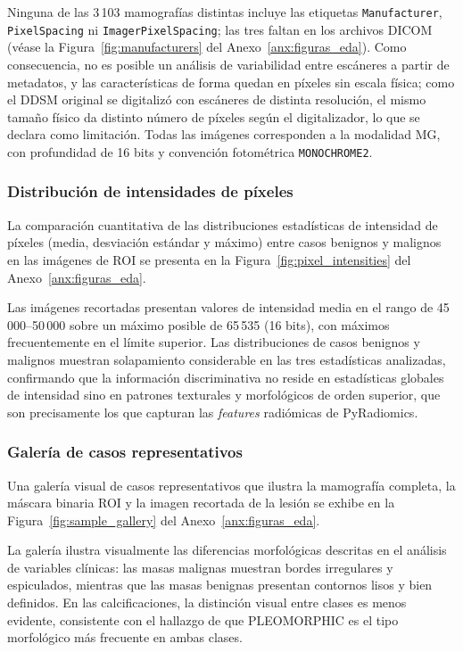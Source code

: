 Ninguna de las 3\,103 mamografías distintas incluye las etiquetas
\texttt{Manufacturer}, \texttt{PixelSpacing} ni
\texttt{ImagerPixelSpacing}; las tres faltan en los archivos
DICOM (véase la Figura~\ref{fig:manufacturers} del Anexo~\ref{anx:figuras_eda}).
Como consecuencia, no es posible un análisis de
variabilidad entre escáneres a partir de metadatos, y las
características de forma quedan en píxeles sin escala física;
como el DDSM original se digitalizó con escáneres de distinta
resolución, el mismo tamaño físico da distinto número de
píxeles según el digitalizador, lo que se declara como
limitación. Todas las imágenes corresponden a la modalidad MG,
con profundidad de 16 bits y convención fotométrica
\texttt{MONOCHROME2}.

\subsubsection{Distribución de intensidades de píxeles}

La comparación cuantitativa de las distribuciones estadísticas
de intensidad de píxeles (media, desviación estándar y máximo)
entre casos benignos y malignos en las imágenes de ROI se presenta
en la Figura~\ref{fig:pixel_intensities} del Anexo~\ref{anx:figuras_eda}.

Las imágenes recortadas presentan valores de
intensidad media en el rango de 45\,000--50\,000
sobre un máximo posible de 65\,535 (16 bits),
con máximos frecuentemente en el límite superior.
Las distribuciones de casos benignos y malignos
muestran solapamiento considerable en las tres
estadísticas analizadas, confirmando que la
información discriminativa no reside en estadísticas
globales de intensidad sino en patrones texturales
y morfológicos de orden superior, que son precisamente
los que capturan las \textit{features} radiómicas
de PyRadiomics.

\subsubsection{Galería de casos representativos}

Una galería visual de casos representativos que ilustra la
mamografía completa, la máscara binaria ROI y la imagen recortada
de la lesión se exhibe en la Figura~\ref{fig:sample_gallery} del
Anexo~\ref{anx:figuras_eda}.

La galería ilustra visualmente las diferencias
morfológicas descritas en el análisis de variables
clínicas: las masas malignas muestran bordes
irregulares y espiculados, mientras que las masas
benignas presentan contornos lisos y bien definidos.
En las calcificaciones, la distinción visual entre
clases es menos evidente, consistente con el hallazgo
de que PLEOMORPHIC es el tipo morfológico más
frecuente en ambas clases.

